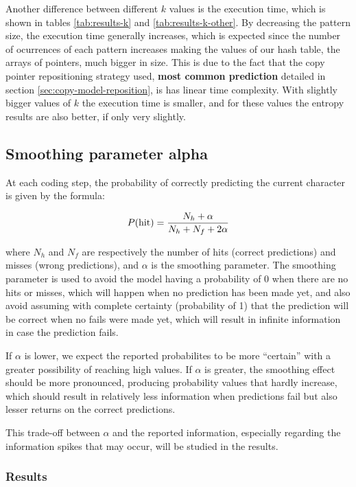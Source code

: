 \documentclass{article}
\begin{document}
Another difference between different $k$ values is the execution time, which is shown in tables \ref{tab:results-k} and \ref{tab:results-k-other}.
By decreasing the pattern size, the execution time generally increases, which is expected since the number of ocurrences of each pattern increases making the values of our hash table, the arrays of pointers, much bigger in size.
This is due to the fact that the copy pointer repositioning strategy used, \textbf{most common prediction} detailed in section \ref{sec:copy-model-reposition}, is has linear time complexity.
With slightly bigger values of $k$ the execution time is smaller, and for these values the entropy results are also better, if only very slightly.

\subsection{Smoothing parameter alpha}
\label{sec:copy-model-alpha}

At each coding step, the probability of correctly predicting the current character is given by the formula:

$$
P(\textnormal{hit}) = \frac{N_h + \alpha}{N_h + N_f + 2\alpha}
$$

where $N_h$ and $N_f$ are respectively the number of hits (correct predictions) and misses (wrong predictions), and $\alpha$ is the smoothing parameter.
The smoothing parameter is used to avoid the model having a probability of 0 when there are no hits or misses, which will happen when no prediction has been made yet, and also avoid assuming with complete certainty (probability of 1) that the prediction will be correct when no fails were made yet, which will result in infinite information in case the prediction fails.

If $\alpha$ is lower, we expect the reported probabilites to be more ``certain'' with a greater possibility of reaching high values.
If $\alpha$ is greater, the smoothing effect should be more pronounced, producing probability values that hardly increase, which should result in relatively less information when predictions fail but also lesser returns on the correct predictions.

This trade-off between $\alpha$ and the reported information, especially regarding the information spikes that may occur, will be studied in the results.

\subsubsection{Results}
\end{document}
